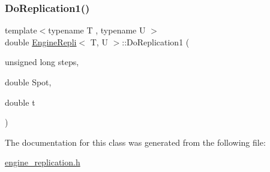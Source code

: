 \subsubsection{\texorpdfstring{Do\+Replication1()}{DoReplication1()}}
{\footnotesize\ttfamily template$<$typename T , typename U $>$ \\
double \hyperlink{classEngineRepli}{Engine\+Repli}$<$ T, U $>$\+::Do\+Replication1 (\begin{DoxyParamCaption}\item[{unsigned long}]{steps,  }\item[{double}]{Spot,  }\item[{double}]{t }\end{DoxyParamCaption})\hspace{0.3cm}{\ttfamily [inline]}}



The documentation for this class was generated from the following file\+:\begin{DoxyCompactItemize}
\item 
\hyperlink{engine__replication_8h}{engine\+\_\+replication.\+h}\end{DoxyCompactItemize}
